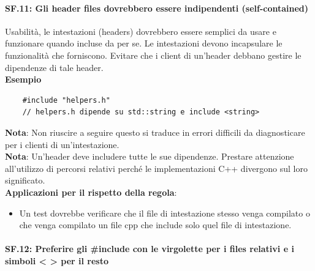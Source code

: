 \paragraph{SF.11: Gli header files dovrebbero essere indipendenti (self-contained)}

\textsf{\small Usabilità, le intestazioni (headers) dovrebbero essere semplici da usare e funzionare quando incluse da per se. Le intestazioni devono incapsulare le funzionalità che forniscono. Evitare che i client di un'header debbano gestire le dipendenze di tale header.} \\

\textsf{\small \textbf{Esempio}}

\begin{lstlisting}
	#include "helpers.h"
	// helpers.h dipende su std::string e include <string>
\end{lstlisting}

\textsf{\small \textbf{Nota}: Non riuscire a seguire questo si traduce in errori difficili da diagnosticare per i clienti di un'intestazione.} \\

\textsf{\small \textbf{Nota}: Un'header deve includere tutte le sue dipendenze. Prestare attenzione all'utilizzo di percorsi relativi perché le implementazioni C++ divergono sul loro significato.} \\

\textsf{\small \textbf{Applicazioni per il rispetto della regola}: }

\begin{itemize}
	\item \textsf{\small Un test dovrebbe verificare che il file di intestazione stesso venga compilato o che venga compilato un file cpp che include solo quel file di intestazione.}
\end{itemize}

\paragraph{SF.12: Preferire gli \#include con le virgolette per i files relativi e i simboli < > per il resto} %

